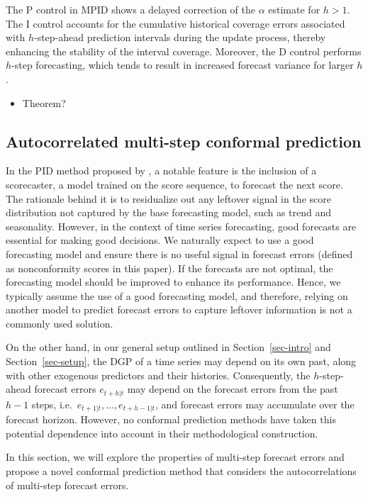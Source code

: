 \documentclass[
  11pt,
  a4paper,
]{article}
\providecommand{\tightlist}{%
  \setlength{\itemsep}{0pt}\setlength{\parskip}{0pt}}\usepackage{longtable,booktabs,array}
\theoremstyle{plain}
\theoremstyle{plain}
\theoremstyle{remark}
\begin{document}
The P control in MPID shows a delayed correction of the \(\alpha\)
estimate for \(h>1\). The I control accounts for the cumulative
historical coverage errors associated with \(h\)-step-ahead prediction
intervals during the update process, thereby enhancing the stability of
the interval coverage. Moreover, the D control performs \(h\)-step
forecasting, which tends to result in increased forecast variance for
larger \(h\).

\begin{itemize}
\tightlist
\item
  Theorem?
\end{itemize}

\subsection{Autocorrelated multi-step conformal
prediction}\label{sec-acmcp}

In the PID method proposed by \textcite{angelopoulos2024}, a notable
feature is the inclusion of a scorecaster, a model trained on the score
sequence, to forecast the next score. The rationale behind it is to
residualize out any leftover signal in the score distribution not
captured by the base forecasting model, such as trend and seasonality.
However, in the context of time series forecasting, good forecasts are
essential for making good decisions. We naturally expect to use a good
forecasting model and ensure there is no useful signal in forecast
errors (defined as nonconformity scores in this paper). If the forecasts
are not optimal, the forecasting model should be improved to enhance its
performance. Hence, we typically assume the use of a good forecasting
model, and therefore, relying on another model to predict forecast
errors to capture leftover information is not a commonly used solution.

On the other hand, in our general setup outlined in
Section~\ref{sec-intro} and Section~\ref{sec-setup}, the DGP of a time
series may depend on its own past, along with other exogenous predictors
and their histories. Consequently, the \(h\)-step-ahead forecast errors
\(e_{t+h|t}\) may depend on the forecast errors from the past \(h-1\)
steps, i.e.~\(e_{t+1|t}, \ldots, e_{t+h-1|t}\), and forecast errors may
accumulate over the forecast horizon. However, no conformal prediction
methods have taken this potential dependence into account in their
methodological construction.

In this section, we will explore the properties of multi-step forecast
errors and propose a novel conformal prediction method that considers
the autocorrelations of multi-step forecast errors.
\end{document}
